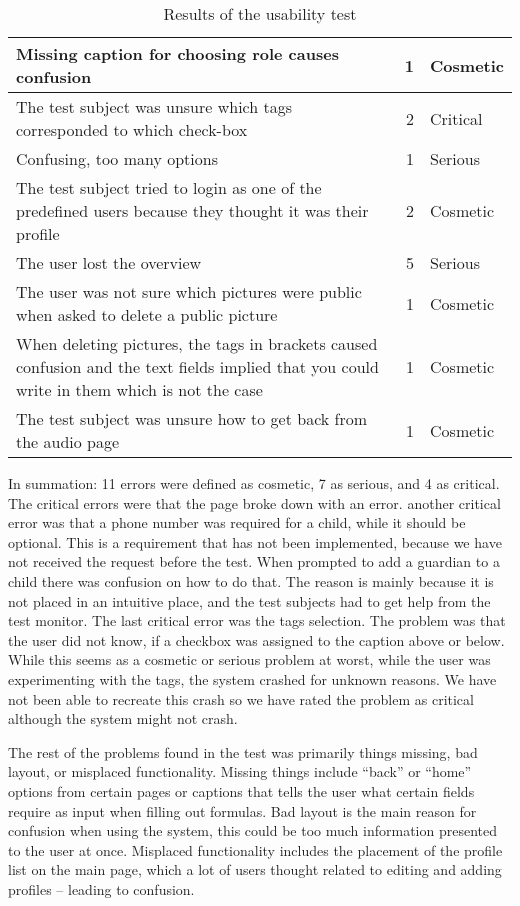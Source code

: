 \begin{table}[H]
\begin{tabular}{|p{7cm}|r|l|}
		Missing caption for choosing role causes confusion & 1 & Cosmetic \\ \hline
		The test subject was unsure which tags corresponded to which check-box & 2 & Critical \\ \hline
		Confusing, too many options & 1 & Serious \\ \hline
		The test subject tried to login as one of the predefined users because they thought it was their profile & 2 & Cosmetic \\ \hline
		The user lost the overview & 5 & Serious \\ \hline
		The user was not sure which pictures were public when asked to delete a public picture & 1 & Cosmetic \\ \hline
		When deleting pictures, the tags in brackets caused confusion and the text fields implied that you could write in them which is not the case & 1 & Cosmetic \\ \hline
		The test subject was unsure how to get back from the audio page & 1 & Cosmetic \\
		\hline
	\end{tabular}
	\caption{Results of the usability test}
	\label{tab:results}
\end{table}

In summation: 11 errors were defined as cosmetic, 7 as serious, and 4 as critical. \\

The critical errors were that the page broke down with an error. another critical error was that a phone number was required for a child, while it should be optional.
This is a requirement that has not been implemented, because we have not received the request before the test.
When prompted to add a guardian to a child there was confusion on how to do that.
The reason is mainly because it is not placed in an intuitive place, and the test subjects had to get help from the test monitor.
The last critical error was the tags selection. The problem was that the user did not know, if a checkbox was assigned to the caption above or below. While this seems as a cosmetic or serious problem at worst, while the user was experimenting with the tags, the system crashed for unknown reasons. We have not been able to recreate this crash so we have rated the problem as critical although the system might not crash.

The rest of the problems found in the test was primarily things missing, bad layout, or misplaced functionality.
Missing things include ``back'' or ``home'' options from certain pages or captions that tells the user what certain fields require as input when filling out formulas. Bad layout is the main reason for confusion when using the system, this could be too much information presented to the user at once.
Misplaced functionality includes the placement of the profile list on the main page, which a lot of users thought related to editing and adding profiles -- leading to confusion. 